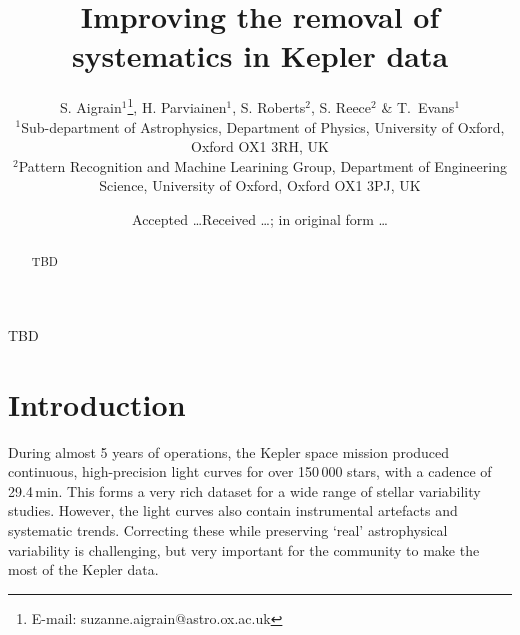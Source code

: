 \documentclass[useAMS,usenatbib]{mn2e}
\title{Improving the removal of systematics in Kepler data}
\author[S. Aigrain et al.]{S. Aigrain$^{1}$\thanks{E-mail:
    suzanne.aigrain@astro.ox.ac.uk}, H. Parviainen$^{1}$,
  S. Roberts$^{2}$, S. Reece$^{2}$ \& 
  T.\ Evans$^{1}$ \\
  $^{1}$Sub-department of Astrophysics, Department of Physics,
  University of Oxford, Oxford OX1 3RH, UK\\
  $^{2}$Pattern Recognition and Machine Learining Group, Department of
  Engineering Science, University of Oxford, Oxford OX1 3PJ, UK}
\begin{document}
\date{Accepted \ldots Received \ldots; in original form \ldots}

\pagerange{\pageref{firstpage}--\pageref{lastpage}} 

\maketitle

\label{firstpage}

\begin{abstract}
TBD
\end{abstract}

\begin{keywords}
TBD
\end{keywords}

\section{Introduction}

During almost 5 years of operations, the Kepler space mission produced
continuous, high-precision light curves for over 150\,000 stars, with
a cadence of 29.4\,min. This forms a very rich dataset for a wide
range of stellar variability studies. However, the light curves also
contain instrumental artefacts and systematic trends. Correcting these while
preserving `real' astrophysical variability is challenging, but very
important for the community to make the most of the Kepler
data. 
\end{document}
